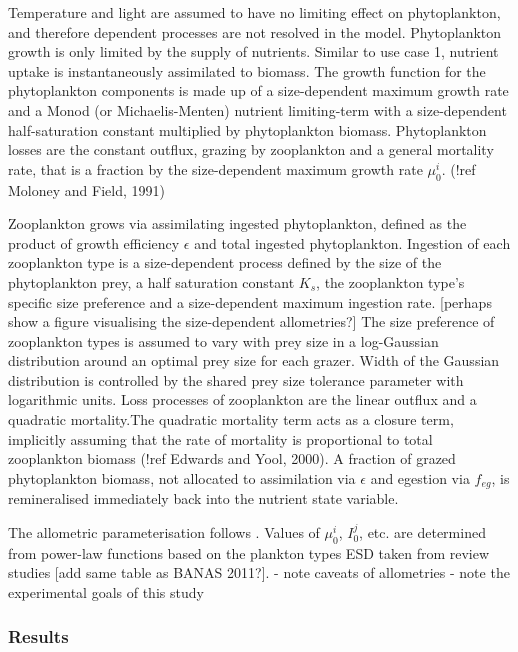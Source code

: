 \documentclass[template.tex]{subfiles}
\begin{document}
Temperature and light are assumed to have no limiting effect on phytoplankton, and therefore dependent processes are not resolved in the model. Phytoplankton growth is only limited by the supply of nutrients. Similar to use case 1, nutrient uptake is instantaneously assimilated to biomass. The growth function for the phytoplankton components is made up of a size-dependent maximum growth rate and a Monod (or Michaelis-Menten) nutrient limiting-term with a size-dependent half-saturation constant multiplied by phytoplankton biomass. 
Phytoplankton losses are the constant outflux, grazing by zooplankton and a general mortality rate, that is a fraction by the size-dependent maximum growth rate $\mu^i_0$. (!ref Moloney and Field, 1991)

Zooplankton grows via assimilating ingested phytoplankton, defined as the product of growth efficiency $\epsilon$ and total ingested phytoplankton. Ingestion of each zooplankton type is a size-dependent process defined by the size of the phytoplankton prey, a half saturation constant $K_s$, the zooplankton type's specific size preference and a size-dependent maximum ingestion rate. [perhaps show a figure visualising the size-dependent allometries?]
The size preference of zooplankton types is assumed to vary with prey size in a log-Gaussian distribution around an optimal prey size for each grazer.
Width of the Gaussian distribution is controlled by the shared prey size tolerance parameter with logarithmic units.
Loss processes of zooplankton are the linear outflux and a quadratic mortality.The quadratic mortality term acts as a closure term, implicitly assuming that the rate of mortality is proportional to total zooplankton biomass (!ref Edwards and Yool, 2000). 
A fraction of grazed phytoplankton biomass, not allocated to assimilation via $\epsilon$ and egestion via $f_{eg}$, is remineralised immediately back into the nutrient state variable.

The allometric parameterisation follows \cite{Banas2011b}. Values of $\mu^i_0$, $I^j_0$, etc. are determined from power-law functions based on the plankton types ESD taken from review studies [add same table as BANAS 2011?].
- note caveats of allometries
- note the experimental goals of this study


\subsubsection{Results}
\end{document}
